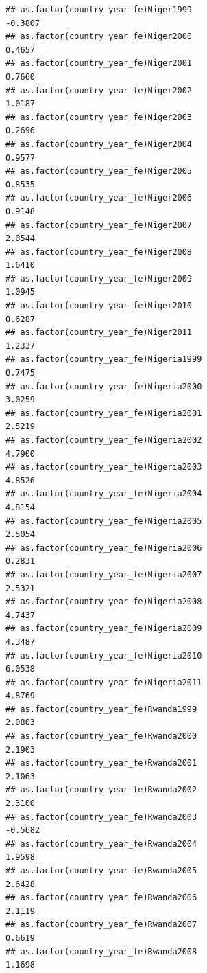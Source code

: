 \documentclass[
  a4paper,
]{article}
\begin{document}
\begin{verbatim}
## as.factor(country_year_fe)Niger1999                            -0.3807
## as.factor(country_year_fe)Niger2000                             0.4657
## as.factor(country_year_fe)Niger2001                             0.7660
## as.factor(country_year_fe)Niger2002                             1.0187
## as.factor(country_year_fe)Niger2003                             0.2696
## as.factor(country_year_fe)Niger2004                             0.9577
## as.factor(country_year_fe)Niger2005                             0.8535
## as.factor(country_year_fe)Niger2006                             0.9148
## as.factor(country_year_fe)Niger2007                             2.0544
## as.factor(country_year_fe)Niger2008                             1.6410
## as.factor(country_year_fe)Niger2009                             1.0945
## as.factor(country_year_fe)Niger2010                             0.6287
## as.factor(country_year_fe)Niger2011                             1.2337
## as.factor(country_year_fe)Nigeria1999                           0.7475
## as.factor(country_year_fe)Nigeria2000                           3.0259
## as.factor(country_year_fe)Nigeria2001                           2.5219
## as.factor(country_year_fe)Nigeria2002                           4.7900
## as.factor(country_year_fe)Nigeria2003                           4.8526
## as.factor(country_year_fe)Nigeria2004                           4.8154
## as.factor(country_year_fe)Nigeria2005                           2.5054
## as.factor(country_year_fe)Nigeria2006                           0.2831
## as.factor(country_year_fe)Nigeria2007                           2.5321
## as.factor(country_year_fe)Nigeria2008                           4.7437
## as.factor(country_year_fe)Nigeria2009                           4.3487
## as.factor(country_year_fe)Nigeria2010                           6.0538
## as.factor(country_year_fe)Nigeria2011                           4.8769
## as.factor(country_year_fe)Rwanda1999                            2.0803
## as.factor(country_year_fe)Rwanda2000                            2.1903
## as.factor(country_year_fe)Rwanda2001                            2.1063
## as.factor(country_year_fe)Rwanda2002                            2.3100
## as.factor(country_year_fe)Rwanda2003                           -0.5682
## as.factor(country_year_fe)Rwanda2004                            1.9598
## as.factor(country_year_fe)Rwanda2005                            2.6428
## as.factor(country_year_fe)Rwanda2006                            2.1119
## as.factor(country_year_fe)Rwanda2007                            0.6619
## as.factor(country_year_fe)Rwanda2008                            1.1698

\end{verbatim}
\end{document}
